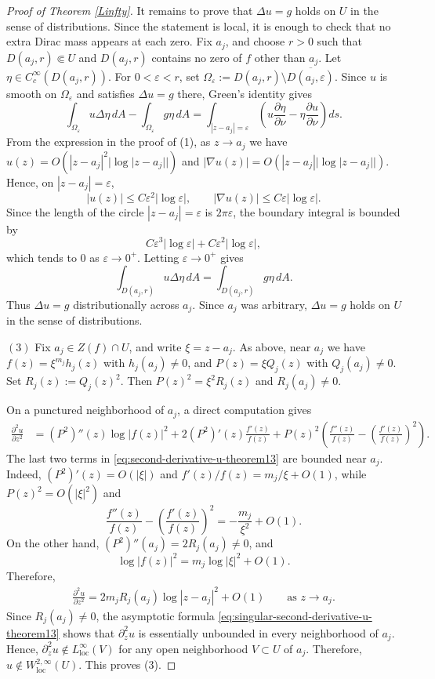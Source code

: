 \documentclass[10pt,a4paper]{amsart}
\begin{document}
\begin{proof}[Proof of Theorem \ref{Linfty}]
It remains to prove that $\Delta u=g$ holds on $U$ in the sense of distributions. Since
the statement is local, it is enough to check that no extra Dirac mass appears at each zero.
Fix $a_j$, and choose $r>0$ such that $D(a_j,r)\Subset U$ and $D(a_j,r)$ contains no zero of
$f$ other than $a_j$. Let $\eta\in C_c^\infty(D(a_j,r))$. For $0<\varepsilon<r$, set
$\Omega_\varepsilon:=D(a_j,r)\setminus\overline{D(a_j,\varepsilon)}$. Since $u$ is smooth on
$\Omega_\varepsilon$ and satisfies $\Delta u=g$ there, Green's identity gives
$$
\int_{\Omega_\varepsilon}u\Delta\eta\,dA
-
\int_{\Omega_\varepsilon}g\eta\,dA
=
\int_{|z-a_j|=\varepsilon}
\left(
u\frac{\partial\eta}{\partial\nu}
-
\eta\frac{\partial u}{\partial\nu}
\right)ds.
$$
From the expression in the proof of (1), as $z\to a_j$ we have
$u(z)=O(|z-a_j|^2|\log|z-a_j||)$ and
$|\nabla u(z)|=O(|z-a_j||\log|z-a_j||)$. Hence, on $|z-a_j|=\varepsilon$,
$$
|u(z)|\le C\varepsilon^2|\log\varepsilon|,
\qquad
|\nabla u(z)|\le C\varepsilon|\log\varepsilon|.
$$
Since the length of the circle $|z-a_j|=\varepsilon$ is $2\pi\varepsilon$, the boundary integral
is bounded by
$$
C\varepsilon^3|\log\varepsilon|+C\varepsilon^2|\log\varepsilon|,
$$
which tends to $0$ as $\varepsilon\to0^+$. Letting $\varepsilon\to0^+$ gives
$$
\int_{D(a_j,r)}u\Delta\eta\,dA
=
\int_{D(a_j,r)}g\eta\,dA.
$$
Thus $\Delta u=g$ distributionally across $a_j$. Since $a_j$ was arbitrary, $\Delta u=g$ holds
on $U$ in the sense of distributions.

$(3)$
Fix $a_j\in Z(f)\cap U$, and write $\xi=z-a_j$. As above, near $a_j$ we have
$f(z)=\xi^{m_j}h_j(z)$ with $h_j(a_j)\neq0$, and $P(z)=\xi Q_j(z)$ with
$Q_j(a_j)\neq0$. Set $R_j(z):=Q_j(z)^2$. Then $P(z)^2=\xi^2R_j(z)$ and
$R_j(a_j)\neq0$.

On a punctured neighborhood of $a_j$, a direct computation gives
\begin{align}
\frac{\partial^2 u}{\partial z^2}
&=
(P^2)''(z)\log|f(z)|^2
+
2(P^2)'(z)\frac{f'(z)}{f(z)}
+
P(z)^2
\left(
\frac{f''(z)}{f(z)}
-
\left(\frac{f'(z)}{f(z)}\right)^2
\right).
\label{eq:second-derivative-u-theorem13}
\end{align}
The last two terms in \eqref{eq:second-derivative-u-theorem13} are bounded near $a_j$.
Indeed, $(P^2)'(z)=O(|\xi|)$ and $f'(z)/f(z)=m_j/\xi+O(1)$, while $P(z)^2=O(|\xi|^2)$ and
$$
\frac{f''(z)}{f(z)}
-
\left(\frac{f'(z)}{f(z)}\right)^2
=
-\frac{m_j}{\xi^2}+O(1).
$$
On the other hand, $(P^2)''(a_j)=2R_j(a_j)\neq0$, and
$$
\log|f(z)|^2
=
m_j\log|\xi|^2+O(1).
$$
Therefore,
\begin{align}
\frac{\partial^2 u}{\partial z^2}
=
2m_jR_j(a_j)\log|z-a_j|^2+O(1)
\qquad \text{as } z\to a_j.
\label{eq:singular-second-derivative-u-theorem13}
\end{align}
Since $R_j(a_j)\neq0$, the asymptotic formula
\eqref{eq:singular-second-derivative-u-theorem13} shows that $\partial_z^2u$ is essentially unbounded in every neighborhood of $a_j$. Hence, $\partial_z^2u\notin L^\infty_{\mathrm{loc}}(V)$ for any open neighborhood
$V\subset U$ of $a_j$.
Therefore,
$u\notin W^{2,\infty}_{\mathrm{loc}}(U)$. This proves (3).
\end{proof}
\end{document}
